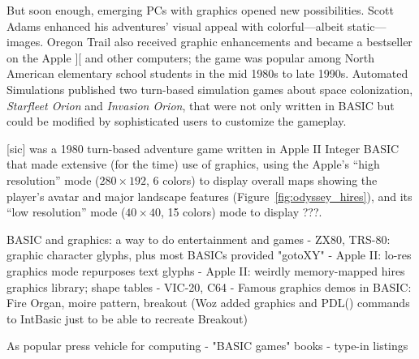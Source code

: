 But soon enough, emerging PCs with graphics opened
new possibilities.
Scott Adams enhanced his adventures' visual appeal with colorful---albeit
static---images.
Oregon Trail also received graphic enhancements and became
a bestseller on the Apple ][ and other computers;
the game was popular among
North American elementary school students in the mid 1980s to late
1990s.  
Automated Simulations published two turn-based simulation games about
space colonization,
\emph{Starfleet Orion} and \emph{Invasion Orion}, that were not only
written in BASIC but could be modified by sophisticated users to
customize the gameplay.

 [sic] was a 1980 turn-based adventure game
written in Apple II Integer BASIC
that made extensive (for the time) use of
graphics, using the Apple's ``high resolution'' mode ($280\times 192$, 6 colors)
to display overall maps showing the player's
avatar and major landscape features (Figure~\ref{fig:odyssey_hires}), and its
``low resolution'' mode ($40\times 40$, 15
colors) mode to display ???.



BASIC and graphics: a way to do entertainment and games
  - ZX80, TRS-80: graphic character glyphs, plus most BASICs provided "gotoXY"
  - Apple II: lo-res graphics mode repurposes text glyphs
  - Apple II: weirdly memory-mapped hires graphics library; shape tables
  - VIC-20, C64
  - Famous graphics demos in BASIC: Fire Organ, moire pattern, breakout
  (Woz added graphics and PDL() commands to IntBasic just to be able to
  recreate Breakout)

As popular press vehicle for computing
  - "BASIC games" books
  - type-in listings


